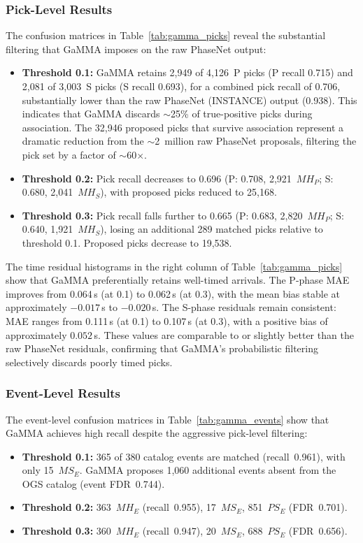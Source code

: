 \subsubsection{Pick-Level Results}
The confusion matrices in Table~\ref{tab:gamma_picks} reveal the substantial
filtering that GaMMA imposes on the raw PhaseNet output:
\begin{itemize}
  \item \textbf{Threshold 0.1:} GaMMA retains 2,949 of 4,126~P picks (P recall
    0.715) and 2,081 of 3,003~S picks (S recall 0.693), for a combined pick
    recall of 0.706, substantially lower than the raw PhaseNet (INSTANCE)
    output (0.938). This indicates that GaMMA discards $\sim$25\% of
    true-positive picks during association. The 32,946 proposed picks that
    survive association represent a dramatic reduction from the $\sim$2~million
    raw PhaseNet proposals, filtering the pick set by a factor of
    $\sim$60$\times$.
  \item \textbf{Threshold 0.2:} Pick recall decreases to 0.696 (P: 0.708,
    2,921~$MH_P$; S: 0.680, 2,041~$MH_S$), with proposed picks reduced to
    25,168.
  \item \textbf{Threshold 0.3:} Pick recall falls further to 0.665 (P: 0.683,
    2,820~$MH_P$; S: 0.640, 1,921~$MH_S$), losing an additional 289 matched
    picks relative to threshold 0.1. Proposed picks decrease to 19,538.
\end{itemize}

The time residual histograms in the right column of Table~\ref{tab:gamma_picks}
show that GaMMA preferentially retains well-timed arrivals. The P-phase MAE
improves from 0.064\,s (at 0.1) to 0.062\,s (at 0.3), with the mean bias stable
at approximately $-0.017$\,s to $-0.020$\,s. The S-phase residuals remain
consistent: MAE ranges from 0.111\,s (at 0.1) to 0.107\,s (at 0.3), with a
positive bias of approximately $0.052$\,s. These values are comparable to or
slightly better than the raw PhaseNet residuals, confirming that GaMMA's
probabilistic filtering selectively discards poorly timed picks.

\subsubsection{Event-Level Results}
The event-level confusion matrices in Table~\ref{tab:gamma_events} show that
GaMMA achieves high recall despite the aggressive pick-level filtering:
\begin{itemize}
  \item \textbf{Threshold 0.1:} 365 of 380 catalog events are matched
    (recall~0.961), with only 15~$MS_E$. GaMMA proposes 1,060 additional events
    absent from the OGS catalog (event \ac{FDR}~0.744).
  \item \textbf{Threshold 0.2:} 363~$MH_E$ (recall~0.955), 17~$MS_E$,
    851~$PS_E$ (\ac{FDR}~0.701).
  \item \textbf{Threshold 0.3:} 360~$MH_E$ (recall~0.947), 20~$MS_E$,
    688~$PS_E$ (\ac{FDR}~0.656).
\end{itemize}

